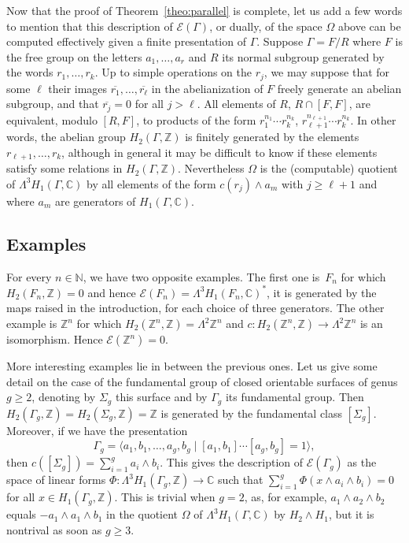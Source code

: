 \documentclass[JEP,XML,SOM,Unicode,NoEqCountersInSection]{cedram}
\let\mathcal\mathscr
\theoremstyle{definition}
\newcommand{\ZZ}{\mathbb{Z}}
\newcommand{\NN}{\mathbb{N}}
\newcommand{\CC}{\mathbb{C}}
\begin{document}
Now that the proof of Theorem~\ref{theo:parallel} is complete, let us add
a few words to mention that this description of $\mathcal{E}(\Gamma)$, or
dually, of the space $\Omega$ above can be computed effectively given a
finite presentation of $\Gamma$. Suppose $\Gamma=F/R$ where $F$ is the free
group on the letters $a_1,\ldots,a_r$ and $R$ its normal subgroup generated
by the words $r_1,\ldots,r_k$. Up to simple operations on the $r_j$, we may
suppose that for some $\ell$ their images
$\overline{r_1},\ldots,\overline{r_\ell}$ in the abelianization of $F$ freely
generate an abelian subgroup, and that $\overline{r_j}=0$ for all $j>\ell$.
All elements of $R$, \resp $R\cap[F,F]$, are equivalent, modulo $[R,F]$, to
products of the form $r_1^{n_1}\cdots r_k^{n_k}$,
\resp $r_{\ell+1}^{n_{\ell+1}}\cdots r_k^{n_k}$.
In other words, the abelian group $H_2(\Gamma,\ZZ)$ is finitely generated by
the elements $r_{\ell+1},\ldots,r_k$, although in general it may be difficult
to know if these elements satisfy some relations in $H_2(\Gamma,\ZZ)$.
Nevertheless $\Omega$ is the (computable) quotient of
$\Lambda^3H_1(\Gamma,\CC)$ by all elements of the form $c(r_j)\wedge a_m$
with $j\geq\ell+1$ and where $a_m$ are generators of $H_1(\Gamma,\CC)$.

\subsection{Examples}
For every $n\in \NN$, we have two opposite examples. The first one is~$F_n$
for which $H_2(F_n,\ZZ)=0$ and hence
$\mathcal{E}(F_n)=\Lambda^3H_1(F_n,\CC)^*$, it is generated by the maps
raised in the introduction, for each choice of three generators.
The other example is $\ZZ^n$ for which $H_2(\ZZ^n,\ZZ)=\Lambda^2\ZZ^n$ and
$c\colon H_2(\ZZ^n,\ZZ)\to \Lambda^2 \ZZ^n$ is an isomorphism.
Hence $\mathcal{E}(\ZZ^n)=0$.

More interesting examples lie in between the previous ones. Let us give
some detail on the case of the fundamental group of closed orientable
surfaces of genus $g\geq 2$, denoting by $\Sigma_g$ this surface and by
$\Gamma_g$ its fundamental group.
Then $H_2(\Gamma_g,\ZZ)=H_2(\Sigma_g,\ZZ)=\ZZ$ is generated by the fundamental
class $[\Sigma_g]$. Moreover, if we have the presentation
\[ \Gamma_g=\langle a_1,b_1,\ldots,a_g,b_g \mid
[a_1,b_1]\cdots[a_g,b_g]=1\rangle, \]
then $c([\Sigma_g])=\sum_{i=1}^g a_i\wedge b_i$. This gives the description
of $\mathcal{E}(\Gamma_g)$ as the space of linear forms
$\Phi :\Lambda^3 H_1(\Gamma_g,\ZZ)\to\CC$ such that
$\sum_{i=1}^g \Phi(x\wedge a_i\wedge b_i)=0$
for all $x\in H_1(\Gamma_g,\ZZ)$. This is trivial when $g=2$, as, for
example, $a_1\wedge a_2\wedge b_2$ equals $-a_1\wedge a_1\wedge b_1$ in
the quotient $\Omega$ of $\Lambda^3H_1(\Gamma,\CC)$ by $H_2\wedge H_1$, but
it is nontrival as soon as $g\geq 3$.
\end{document}
